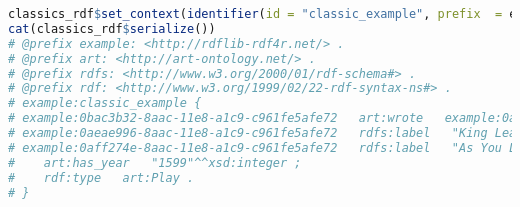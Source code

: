 















\begin{lstlisting}[language=R, label=listing:rdf-2, basicstyle=\ttfamily\scriptsize, caption=Creating RDF]
classics_rdf$set_context(identifier(id = "classic_example", prefix  = eg))
cat(classics_rdf$serialize())
# @prefix example: <http://rdflib-rdf4r.net/> .
# @prefix art: <http://art-ontology.net/> .
# @prefix rdfs: <http://www.w3.org/2000/01/rdf-schema#> .
# @prefix rdf: <http://www.w3.org/1999/02/22-rdf-syntax-ns#> .
# example:classic_example {
# example:0bac3b32-8aac-11e8-a1c9-c961fe5afe72   art:wrote   example:0aeae996-8aac-11e8-a1c9-c961fe5afe72 ,  example:0aff274e-8aac-11e8-a1c9-c961fe5afe72 . 
# example:0aeae996-8aac-11e8-a1c9-c961fe5afe72   rdfs:label   "King Lear"@en . 
# example:0aff274e-8aac-11e8-a1c9-c961fe5afe72   rdfs:label   "As You Like It"@en ;
#	 art:has_year   "1599"^^xsd:integer ;
#	 rdf:type   art:Play .
# }
\end{lstlisting}

